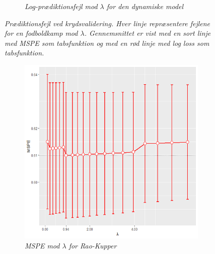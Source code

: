 \documentclass[11pt,a4paper]{article}
\begin{document}
\begin{figure}[h!]
\begin{subfigure}[b]{0.45\linewidth}
    \caption{\textit{Log-prædiktionsfejl mod $\lambda$ for den dynamiske model}}
    \label{fig:DynLogLossLine}  
    \end{subfigure}
\caption{\textit{Prædiktionsfejl ved krydsvalidering. Hver linje repræsentere fejlene for en fodboldkamp mod $\lambda$. Gennemsnittet er vist med en sort linje med MSPE som tabsfunktion og med en rød linje med log loss som tabsfunktion.}}
  \label{fig:Prædiktionsfejl}
\end{figure}


\begin{figure}[h!]
  \centering
\begin{subfigure}[b]{0.45\textwidth}
\includegraphics[width=\textwidth]{MSPEBARPLOTSTATNY1.png}
    \caption{\textit{MSPE mod $\lambda$ for Rao-Kupper}}
    \label{fig:MSPEBarStat}
  \end{subfigure}
  \hspace{0.2cm}
    \begin{subfigure}[b]{0.45\textwidth}

\end{subfigure}
\end{figure}
\end{document}
